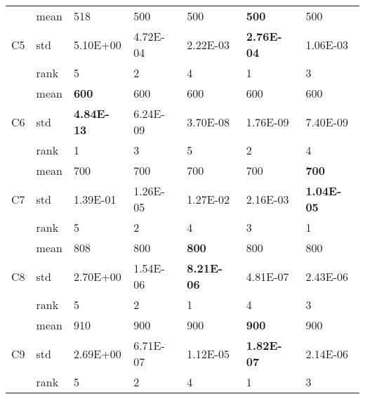 \begin{table}[]
\begin{tabular}{|l|l|l|l|l|l|l|}
\multirow{3}{*}{C5}  & mean & 518               & 500               & 500               & \textbf{500}      & 500               \\ \cline{2-7} 
                     & std  & 5.10E+00          & 4.72E-04          & 2.22E-03          & \textbf{2.76E-04} & 1.06E-03          \\ \cline{2-7} 
                     & rank & 5                 & 2                 & 4                 & 1                 & 3                 \\ \hline
\multirow{3}{*}{C6}  & mean & \textbf{600}      & 600               & 600               & 600               & 600               \\ \cline{2-7} 
                     & std  & \textbf{4.84E-13} & 6.24E-09          & 3.70E-08          & 1.76E-09          & 7.40E-09          \\ \cline{2-7} 
                     & rank & 1                 & 3                 & 5                 & 2                 & 4                 \\ \hline
\multirow{3}{*}{C7}  & mean & 700               & 700               & 700               & 700               & \textbf{700}      \\ \cline{2-7} 
                     & std  & 1.39E-01          & 1.26E-05          & 1.27E-02          & 2.16E-03          & \textbf{1.04E-05} \\ \cline{2-7} 
                     & rank & 5                 & 2                 & 4                 & 3                 & 1                 \\ \hline
\multirow{3}{*}{C8}  & mean & 808               & 800               & \textbf{800}      & 800               & 800               \\ \cline{2-7} 
                     & std  & 2.70E+00          & 1.54E-06          & \textbf{8.21E-06} & 4.81E-07          & 2.43E-06          \\ \cline{2-7} 
                     & rank & 5                 & 2                 & 1                 & 4                 & 3                 \\ \hline
\multirow{3}{*}{C9}  & mean & 910               & 900               & 900               & \textbf{900}      & 900               \\ \cline{2-7} 
                     & std  & 2.69E+00          & 6.71E-07          & 1.12E-05          & \textbf{1.82E-07} & 2.14E-06          \\ \cline{2-7} 
                     & rank & 5                 & 2                 & 4                 & 1                 & 3                 \\ \hline

\end{tabular}
\end{table}
